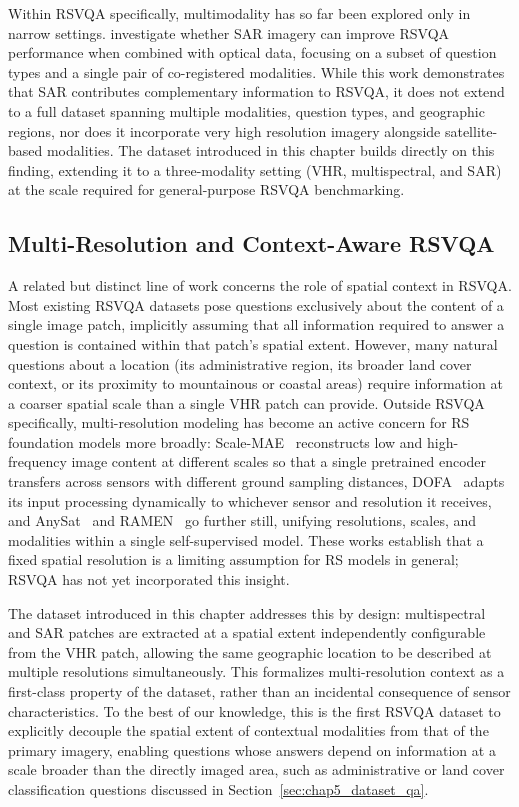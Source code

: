 Within RSVQA specifically, multimodality has so far been
explored only in narrow settings.
\textcite{tosato2024sar} investigate whether SAR imagery can
improve RSVQA performance when combined with optical data,
focusing on a subset of question types and a single pair of
co-registered modalities. While this work demonstrates that
SAR contributes complementary information to RSVQA, it does
not extend to a full dataset spanning multiple modalities,
question types, and geographic regions, nor does it
incorporate very high resolution imagery alongside
satellite-based modalities. The dataset introduced in this
chapter builds directly on this finding, extending it to a
three-modality setting (VHR, multispectral, and SAR) at the
scale required for general-purpose RSVQA benchmarking.

\subsection{Multi-Resolution and Context-Aware RSVQA}
\label{sec:chap5_rw_context}

A related but distinct line of work concerns the role of
spatial context in RSVQA. Most existing RSVQA datasets pose
questions exclusively about the content of a single image
patch, implicitly assuming that all information required to
answer a question is contained within that patch's spatial
extent. However, many natural questions about a location (its administrative region, its broader land cover context,
or its proximity to mountainous or coastal areas) require
information at a coarser spatial scale than a single VHR
patch can provide. Outside RSVQA specifically, multi-resolution
modeling has become an active concern for RS foundation
models more broadly: Scale-MAE~\cite{reed2023scalemae}
reconstructs low and high-frequency image content at
different scales so that a single pretrained encoder
transfers across sensors with different ground sampling
distances, DOFA~\cite{xiong2024dofa} adapts its input
processing dynamically to whichever sensor and resolution it
receives, and AnySat~\cite{astruc2024anysat} and
RAMEN~\cite{houdre2026ramen} go further still, unifying
resolutions, scales, and modalities within a single
self-supervised model. These works establish that a fixed
spatial resolution is a limiting assumption for RS models in
general; RSVQA has not yet incorporated this insight.

The dataset introduced in this chapter addresses this by
design: multispectral and SAR patches are extracted at a
spatial extent independently configurable from the VHR
patch, allowing the same geographic location to be described
at multiple resolutions simultaneously. This formalizes
multi-resolution context as a first-class property of the
dataset, rather than an incidental consequence of sensor
characteristics. To the best of our knowledge, this is the
first RSVQA dataset to explicitly decouple the spatial extent
of contextual modalities from that of the primary imagery,
enabling questions whose answers depend on information at a
scale broader than the directly imaged area, such as
administrative or land cover classification questions
discussed in Section~\ref{sec:chap5_dataset_qa}.

